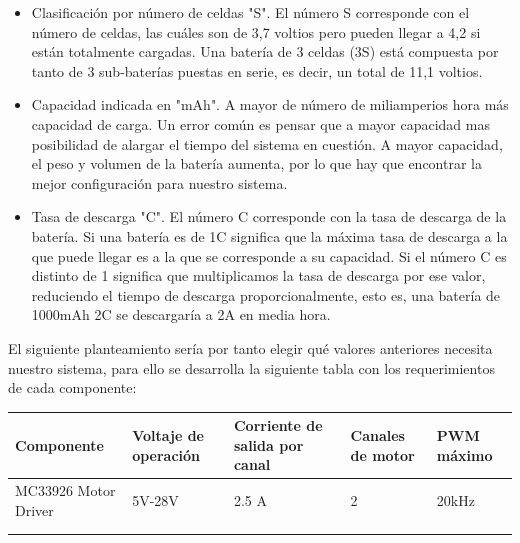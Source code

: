 \begin{itemize}
	\item Clasificación por número de celdas "S". El número S corresponde con el número de celdas, las cuáles son de 3,7 voltios pero pueden llegar a 4,2 si están totalmente cargadas. Una batería de 3 celdas (3S) está compuesta por tanto de 3 sub-baterías puestas en serie, es decir, un total de 11,1 voltios.
	\item Capacidad indicada en "mAh". A mayor de número de miliamperios hora más capacidad de carga. Un error común es pensar que a mayor capacidad mas posibilidad de alargar el tiempo del sistema en cuestión. A mayor capacidad, el peso y volumen de la batería aumenta, por lo que hay que encontrar la mejor configuración para nuestro sistema. 
	\item Tasa de descarga "C". El número C corresponde con la tasa de descarga de la batería. Si una batería es de 1C significa que la máxima tasa de descarga a la que puede llegar es a la que se corresponde a su capacidad. Si el número C es distinto de 1 significa que multiplicamos la tasa de descarga por ese valor, reduciendo el tiempo de descarga proporcionalmente, esto es, una batería de 1000mAh 2C se descargaría a 2A en media hora.
\end{itemize}

El siguiente planteamiento sería por tanto elegir qué valores anteriores necesita nuestro sistema, para ello se desarrolla la siguiente tabla con los requerimientos de cada componente:

\begin{table}[H]
	\begin{tabular}{lllll}
		\hline
		\multicolumn{1}{|l|}{Componente}           & \multicolumn{1}{l|}{Voltaje de operación} & \multicolumn{1}{l|}{Corriente de salida por canal} & \multicolumn{1}{l|}{Canales de motor} & \multicolumn{1}{l|}{PWM máximo} \\ \hline
		\multicolumn{1}{|l|}{MC33926 Motor Driver} & \multicolumn{1}{l|}{5V-28V}               & \multicolumn{1}{l|}{2.5 A}                         & \multicolumn{1}{l|}{2}                & \multicolumn{1}{l|}{20kHz}      \\ \hline
		&                                           &                                                    &                                       &                                 \\
		&                                           &                                                    &                                       &                                
	\end{tabular}
\end{table}



